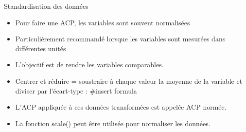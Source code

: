 \documentclass[ignorenonframetext,]{beamer}
\providecommand{\tightlist}{%
  \setlength{\itemsep}{0pt}\setlength{\parskip}{0pt}}
\begin{document}
\begin{frame}{Standardisation des données}

\begin{itemize}
\tightlist
\item
  Pour faire une ACP, les variables sont souvent normalisées
\item
  Particulièrement recommandé lorsque les variables sont mesurées dans
  différentes unités
\item
  L'objectif est de rendre les variables comparables.
\item
  Centrer et réduire = soustraire à chaque valeur la moyenne de la
  variable et diviser par l'écart-type : \#insert formula
\item
  L'ACP appliquée à ces données transformées est appelée ACP normée.
\item
  La fonction scale() peut être utilisée pour normaliser les données.
\end{itemize}

\end{frame}
\end{document}
